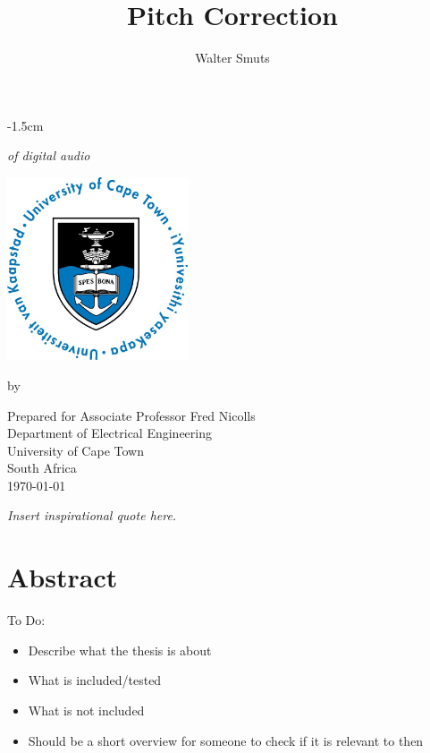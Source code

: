 \documentclass[12pt, twoside, openright]{report}
\title{Pitch Correction}
\author{Walter Smuts}
\makeatletter
\newcommand{\frontpageoffset}{-1.5cm}
\newcommand{\frontpageoffset}{0cm}
\def\cleardoublepage{\clearpage\if@twoside \ifodd\c@page\else
\hbox{}
\vspace*{\fill}
\begin{center}
	\it Insert inspirational quote here.
\end{center}
\vspace{\fill}
\thispagestyle{empty}
\newpage
\if@twocolumn\hbox{}\newpage\fi\fi\fi}
\makeatother
\begin{document}
\makeatletter
\let\TITLE\@title
\makeatother

\begin{titlepage}
\begin{adjustwidth*}{}{\frontpageoffset} %
\begin{center}
	\vspace*{4cm}

	{\Huge\textbf\thetitle}

	{\it of digital audio}

	\vspace{0.8cm}
	\includegraphics[width=0.4\textwidth]{UCT.jpg}
	\vspace{0.8cm}

	by \theauthor
	\vspace{0.8cm}

	Prepared for Associate Professor Fred Nicolls\\
	Department of Electrical Engineering\\
	University of Cape Town\\
	South Africa\\
	\vspace{2cm}
	\today
\end{center}
\end{adjustwidth*}
\end{titlepage}
\cleardoublepage

\setcounter{page}{1}

\section*{Abstract}

{\color{red}
To Do:
\begin{itemize}
	\item Describe what the thesis is about
	\item What is included/tested
	\item What is not included
	\item Should be a short overview for someone to check if it is relevant
	to then
	\end{itemize}
\color{black}
}
\end{document}
